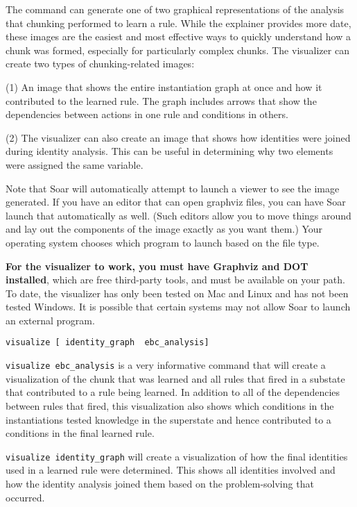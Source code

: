 The  command can generate one of two graphical representations of the analysis that chunking performed to learn a rule. While the explainer provides more date, these images are the easiest and most
effective ways to quickly understand how a chunk was formed, especially for particularly complex chunks.  The visualizer can create two types of chunking-related images:

(1) An image that shows the entire instantiation graph at once and how it contributed to the learned rule. The graph includes arrows that show the dependencies between actions in one rule and conditions in others. 

(2) The visualizer can also create an image that shows how identities were joined during identity analysis. This can be useful in determining why two elements were assigned the same variable.

Note that Soar will automatically attempt to launch a viewer to see the image generated. If you have an editor that can open graphviz files, you can have Soar launch that automatically as well. (Such editors allow you to move things around and lay out the components of the image exactly as you want them.) Your operating system chooses which program to launch based on the file type. 


\textbf{For the visualizer to work, you must have Graphviz and DOT installed}, which are free third-party tools, and must be available on your path.  To date, the visualizer has only been tested on Mac and Linux and has not been tested Windows.  It is possible that certain systems may not allow Soar to launch an external program.

\texttt{visualize\ {[}\ identity\_graph\ \textbar{}\ ebc\_analysis{]}}


\texttt{visualize\ ebc\_analysis} is a very informative command that will create a visualization of the chunk that was learned and all rules that fired in a substate that contributed to a rule being learned. In addition to all of the dependencies between rules that fired, this visualization also shows which conditions in the instantiations tested knowledge in the superstate and hence contributed to a conditions in the final learned rule.

\texttt{visualize\ identity\_graph} will create a visualization of how the final identities used in a learned rule were determined. This shows all identities involved and how the identity analysis joined them based on the problem-solving that occurred.

